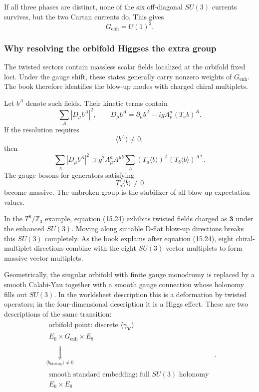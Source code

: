 \documentclass[
  10pt,
  a4paper,
  openany]{book}
\begin{document}
If all three phases are distinct, none of the six off-diagonal \(SU(3)\)
currents survives, but the two Cartan currents do. This gives \[
\boxed{
G_{\mathrm{enh}}=U(1)^2
}.
\]

\subsubsection{Why resolving the orbifold Higgses the extra
group}\label{why-resolving-the-orbifold-higgses-the-extra-group}

The twisted sectors contain massless scalar fields localized at the
orbifold fixed loci. Under the gauge shift, these states generally carry
nonzero weights of \(G_{\mathrm{enh}}\). The book therefore identifies
the blow-up modes with charged chiral multiplets.

Let \(b^A\) denote such fields. Their kinetic terms contain \[
\sum_A
\left|D_\mu b^A\right|^2,
\qquad
D_\mu b^A
=
\partial_\mu b^A
-igA_\mu^a(T_a b)^A.
\] If the resolution requires \[
\langle b^A\rangle\neq0,
\] then \[
\sum_A|D_\mu b^A|^2
\supset
g^2 A_\mu^a A^{\mu b}
\sum_A
(T_a\langle b\rangle)^A
(T_b\langle b\rangle)^{A*}.
\] The gauge bosons for generators satisfying \[
T_a\langle b\rangle\neq0
\] become massive. The unbroken group is the stabilizer of all blow-up
expectation values.

In the \(T^6/\mathbb Z_3\) example, equation (15.24) exhibits twisted
fields charged as \(\mathbf3\) under the enhanced \(SU(3)\). Moving
along suitable D-flat blow-up directions breaks this \(SU(3)\)
completely. As the book explains after equation (15.24), eight
chiral-multiplet directions combine with the eight \(SU(3)\) vector
multiplets to form massive vector multiplets.

Geometrically, the singular orbifold with finite gauge monodromy is
replaced by a smooth Calabi-Yau together with a smooth gauge connection
whose holonomy fills out \(SU(3)\). In the worldsheet description this
is a deformation by twisted operators; in the four-dimensional
description it is a Higgs effect. These are two descriptions of the same
transition: \[
\begin{gathered}
\boxed{\begin{array}{c}
\text{orbifold point: discrete }\langle\gamma_{\mathbf V}\rangle\\
E_6\times G_{\mathrm{enh}}\times E_8
\end{array}}\\[4pt]
\underset{\langle b_{\mathrm{blow\text{-}up}}\rangle\neq0}{\Downarrow}\\[4pt]
\boxed{\begin{array}{c}
\text{smooth standard embedding: full }SU(3)\text{ holonomy}\\
E_6\times E_8
\end{array}}
\end{gathered}.
\]
\end{document}
